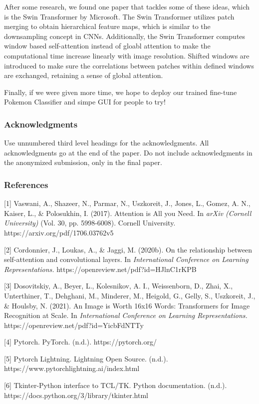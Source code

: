\documentclass{article} %
\begin{document}
After some  research, we found one paper that tackles some of these ideas, which is the Swin Transformer by Microsoft. The Swin Transformer utilizes patch merging to obtain hierarchical feature maps, which is similar to the downsampling concept in CNNs. Additionally, the Swin Transformer computes window based self-attention instead of gloabl attention to make the computational time increase linearly with image resolution. Shifted windows are introduced to make sure the correlations between patches within defined windows are exchanged, retaining a sense of global attention.

Finally, if we were given more time, we hope to deploy our trained fine-tune Pokemon Classifier and simpe GUI for people to try!

\subsubsection*{Acknowledgments}

Use unnumbered third level headings for the acknowledgments. All
acknowledgments go at the end of the paper. Do not include 
acknowledgments in the anonymized submission, only in the 
final paper. 

\subsubsection*{References}

\small{
[1] Vaswani, A., Shazeer, N., Parmar, N., Uszkoreit, J., Jones, L., 
Gomez, A. N., Kaiser, L., \& Polosukhin, I. (2017). Attention is All 
you Need. In {\it arXiv (Cornell University)} (Vol. 30, pp. 5998-6008). 
Cornell University. https://arxiv.org/pdf/1706.03762v5

[2] Cordonnier, J., Loukas, A., \& Jaggi, M. (2020b). On the 
relationship between self-attention and convolutional layers. In {\it International 
Conference on Learning Representations.} https://openreview.net/pdf?id=HJlnC1rKPB

[3] Dosovitskiy, A., Beyer, L., Kolesnikov, A. I., Weissenborn, D., Zhai, X., 
Unterthiner, T., Dehghani, M., Minderer, M., Heigold, G., Gelly, S., Uszkoreit, 
J., \& Houlsby, N. (2021). An Image is Worth 16x16 Words: Transformers for Image 
Recognition at Scale. In {\it International Conference on Learning Representations.}
https://openreview.net/pdf?id=YicbFdNTTy

[4] Pytorch. PyTorch. (n.d.). https://pytorch.org/ 

[5] Pytorch Lightning. Lightning Open Source. (n.d.). https://www.pytorchlightning.ai/index.html 

[6] Tkinter-Python interface to TCL/TK. Python documentation. (n.d.). https://docs.python.org/3/library/tkinter.html 

}
\end{document}

